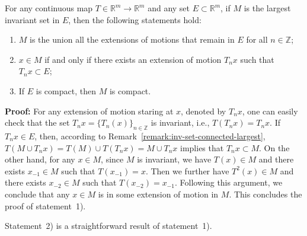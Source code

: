 \documentclass[10pt]{svmult}
\begin{document}
\begin{lemma}\label{lem:inv-set-largest}
For any continuous map $T\in \mathbb{R}^m \to \mathbb{R}^m$ and any set $E\subset \mathbb{R}^m$, if $M$ is the largest invariant set in $E$, then the following statements hold:
\begin{enumerate}[label=\arabic*)]
\item $M$ is the union all the extensions of motions that remain in $E$ for all $n\in \mathbb{Z}$;
\item $x\in M$ if and only if there exists an extension of motion $T_n x$ such that $T_n x\subset E$;
\item If $E$ is compact, then $M$ is compact.
\end{enumerate}
\end{lemma}

\textbf{Proof:} For any extension of motion staring at $x$, denoted by $T_n x$, one can easily check that the set $T_n x=\{T_n(x)\}_{n\in \mathbb{Z}}$ is invariant, i.e., $T(T_n x)=T_n x$. If $T_n x\in E$, then, according to Remark~\ref{remark:inv-set-connected-largest}, $T(M\cup T_n x)=T(M)\cup T(T_n x)=M\cup T_n x$ implies that $T_n x \subset M$. On the other hand, for any $x\in M$, since $M$ is invariant, we have $T(x)\in M$ and there exists $x_{-1}\in M$ such that $T(x_{-1})=x$. Then we further have $T^2(x)\in M$ and there exists $x_{-2}\in M$ such that $T(x_{-2})=x_{-1}$. Following this argument, we conclude that any $x\in M$ is in some extension of motion in $M$. This concludes the proof of statement~1).

Statement~2) is a straightforward result of statement~1).
\end{document}
